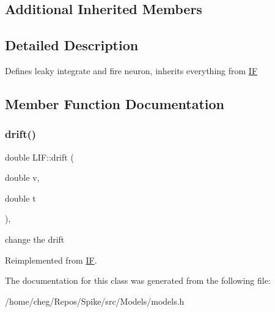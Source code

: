 \subsection*{Additional Inherited Members}


\subsection{Detailed Description}
Defines leaky integrate and fire neuron, inherits everything from \mbox{\hyperlink{classIF}{IF}} 

\subsection{Member Function Documentation}
\mbox{\label{classLIF_aea677a0cf3f943edb7a957479e18d6dc}} 
\subsubsection{\texorpdfstring{drift()}{drift()}}
{\footnotesize\ttfamily double L\+I\+F\+::drift (\begin{DoxyParamCaption}\item[{double}]{v,  }\item[{double}]{t }\end{DoxyParamCaption})\hspace{0.3cm}{\ttfamily [inline]}, {\ttfamily [virtual]}}

change the drift 

Reimplemented from \mbox{\hyperlink{classIF_a9bbd53df68cb9028bf87cf5273253e91}{IF}}.



The documentation for this class was generated from the following file\+:\begin{DoxyCompactItemize}
\item 
/home/cheg/\+Repos/\+Spike/src/\+Models/models.\+h\end{DoxyCompactItemize}
